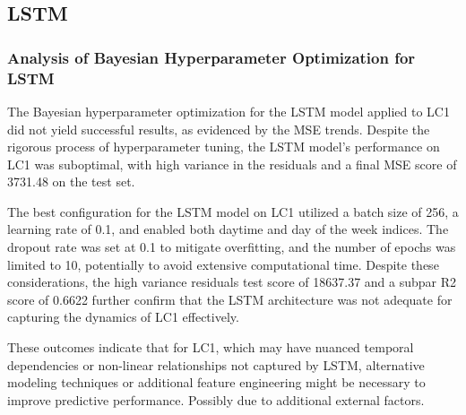 \documentclass{article} %
\begin{document}
\subsection{LSTM}
\subsubsection{Analysis of Bayesian Hyperparameter Optimization for LSTM}
The Bayesian hyperparameter optimization for the \gls*{LSTM} model applied to \gls*{LC1} did not yield successful results, as evidenced by the \gls*{MSE} trends. Despite the rigorous process of hyperparameter tuning, the \gls*{LSTM} model's performance on \gls*{LC1} was suboptimal, with high variance in the residuals and a final \gls*{MSE} score of 3731.48 on the test set. 

The best configuration for the \gls*{LSTM} model on \gls*{LC1} utilized a batch size of 256, a learning rate of 0.1, and enabled both daytime and day of the week indices. The dropout rate was set at 0.1 to mitigate overfitting, and the number of epochs was limited to 10, potentially to avoid extensive computational time. Despite these considerations, the high variance residuals test score of 18637.37 and a subpar R2 score of 0.6622 further confirm that the \gls*{LSTM} architecture was not adequate for capturing the dynamics of \gls*{LC1} effectively.

These outcomes indicate that for \gls*{LC1}, which may have nuanced temporal dependencies or non-linear relationships not captured by \gls*{LSTM}, alternative modeling techniques or additional feature engineering might be necessary to improve predictive performance.
Possibly due to additional external factors.
\end{document}

